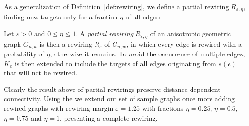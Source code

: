 As a generalization of Definition~\ref{def:rewiring}, we define a
partial rewiring $R_{\varepsilon, \eta}$, finding new targets only for
a fraction $\eta$ of all edges:

\begin{definition}Let $\varepsilon > 0$ and $0 \leq \eta \leq 1$. A
  \textit{partial rewiring} $R_{\varepsilon,\eta}$ of an anisotropic
  geometric graph $G_{n,w}$ is then a rewiring $R_{\varepsilon}$ of
  $G_{n,w}$, in which every edge is rewired with a probability of
  $\eta$, otherwise it remains. To avoid the occurrence of multiple
  edges, $K_e$ is then extended to include the targets of all edges
  originating from $s(e)$ that will not be rewired.
\end{definition}

Clearly the result above of partial rewirings preserve
distance-dependent connectivity. Using the we extend our set of sample
graphs once more adding rewired graphs with rewiring margin
$\varepsilon = 1.25$ with fractions $\eta = 0.25$, $\eta = 0.5$, $\eta
= 0.75$ and $\eta = 1$, presenting a complete rewiring.




 



